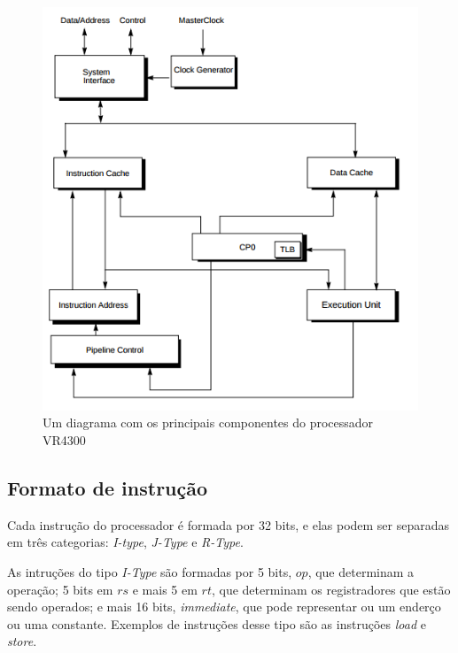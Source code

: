 \documentclass[12pt]{article}
\begin{document}
\begin{figure}[H]
    \label{fig:vr4300dia}
    \centering
        \includegraphics[scale=.65]{figures/vr4300diagram}
    \caption{Um diagrama com os principais componentes do processador 
        VR4300}
\end{figure}

\subsection{Formato de instrução}
    Cada instrução do processador é formada por 32 bits, e elas podem
ser separadas em três categorias: \emph{I-type}, \emph{J-Type} e 
\emph{R-Type}. 

    As intruções do tipo \emph{I-Type} são formadas por 5 bits, $op$,
que determinam a operação; 5 bits em $rs$ e mais 5 em $rt$, que
determinam os registradores que estão sendo operados; e mais 16 bits,
{\em immediate}, que pode representar ou um enderço ou uma constante.
Exemplos de instruções desse tipo são as instruções {\em load} e 
{\em store}.
\end{document}

